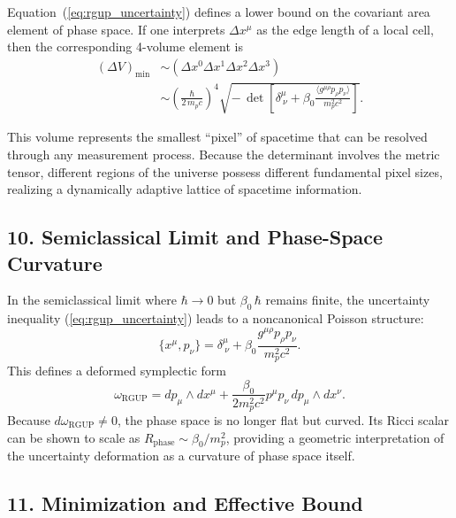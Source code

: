 \documentclass[11pt,oneside]{book}
\numberwithin{equation}{chapter}
\newcommand{\mpx}{m_p}               %
\newcommand{\betaz}{\beta_0}
\begin{document}
Equation~(\ref{eq:rgup_uncertainty}) defines a lower bound on the
covariant area element of phase space.
If one interprets $\Delta x^\mu$ as the edge length of a local cell,
then the corresponding 4-volume element is
\begin{equation}
\begin{aligned}
(\Delta V)_{\min}
&\sim (\Delta x^0 \Delta x^1 \Delta x^2 \Delta x^3) \\[4pt]
&\sim
\left(\frac{\hbar}{2\,\mpx c}\right)^{\!4}
\sqrt{-\,\det\!\left[
\delta^\mu_{\ \nu}
+ \betaz\frac{\langle g^{\mu\rho}p_\rho p_\nu\rangle}
      {\mpx^2 c^2}
\right]} .
\end{aligned}
\label{eq:min_volume}
\end{equation}

This volume represents the smallest ``pixel'' of spacetime that can
be resolved through any measurement process.
Because the determinant involves the metric tensor,
different regions of the universe possess different fundamental pixel sizes,
realizing a dynamically adaptive lattice of spacetime information.

\subsection*{10. Semiclassical Limit and Phase-Space Curvature}

In the semiclassical limit where $\hbar\to0$ but $\betaz\,\hbar$ remains finite,
the uncertainty inequality (\ref{eq:rgup_uncertainty}) leads to
a noncanonical Poisson structure:
\begin{equation}
\{x^\mu,p_\nu\}
= \delta^\mu_{\ \nu}
+ \betaz\frac{g^{\mu\rho}p_\rho p_\nu}{\mpx^2 c^2}.
\end{equation}
This defines a deformed symplectic form
\begin{equation}
\omega_{\text{RGUP}}
= dp_\mu \wedge dx^\mu
+ \frac{\betaz}{2\mpx^2 c^2}
p^\mu p_\nu\,dp_\mu\wedge dx^\nu.
\end{equation}
Because $d\omega_{\text{RGUP}}\neq0$, the phase space is no longer flat but curved.
Its Ricci scalar can be shown to scale as
$R_{\text{phase}}\sim\betaz/\mpx^2$, providing a geometric interpretation of
the uncertainty deformation as a curvature of phase space itself.

\subsection*{11. Minimization and Effective Bound}
\end{document}
